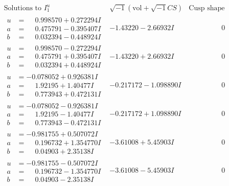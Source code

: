\documentclass[1p]{elsarticle_modified}
\theoremstyle{definition}
\newcommand{\I}{\sqrt{-1}}
\begin{document}
$$\begin{array}{c|c|c}  
\text{Solutions to }I^u_{1}& \I (\text{vol} + \sqrt{-1}CS) & \text{Cusp shape}\\
 \hline 
\begin{aligned}
u &= \phantom{-}0.998570 + 0.272294 I \\
a &= \phantom{-}0.475791 - 0.395407 I \\
b &= \phantom{-}0.032394 - 0.448924 I\end{aligned}
 & -1.43220 - 2.66932 I & \phantom{-0.000000 } 0 \\ \hline\begin{aligned}
u &= \phantom{-}0.998570 - 0.272294 I \\
a &= \phantom{-}0.475791 + 0.395407 I \\
b &= \phantom{-}0.032394 + 0.448924 I\end{aligned}
 & -1.43220 + 2.66932 I & \phantom{-0.000000 } 0 \\ \hline\begin{aligned}
u &= -0.078052 + 0.926381 I \\
a &= \phantom{-}1.92195 + 1.40477 I \\
b &= \phantom{-}0.773943 + 0.472131 I\end{aligned}
 & -0.217172 - 1.098890 I & \phantom{-0.000000 } 0 \\ \hline\begin{aligned}
u &= -0.078052 - 0.926381 I \\
a &= \phantom{-}1.92195 - 1.40477 I \\
b &= \phantom{-}0.773943 - 0.472131 I\end{aligned}
 & -0.217172 + 1.098890 I & \phantom{-0.000000 } 0 \\ \hline\begin{aligned}
u &= -0.981755 + 0.507072 I \\
a &= \phantom{-}0.196732 + 1.354770 I \\
b &= \phantom{-}0.04903 + 2.35138 I\end{aligned}
 & -3.61008 + 5.45903 I & \phantom{-0.000000 } 0 \\ \hline\begin{aligned}
u &= -0.981755 - 0.507072 I \\
a &= \phantom{-}0.196732 - 1.354770 I \\
b &= \phantom{-}0.04903 - 2.35138 I\end{aligned}
 & -3.61008 - 5.45903 I & \phantom{-0.000000 } 0 \\ \hline\begin{aligned}

\end{aligned}
\end{array}$$
\end{document}
